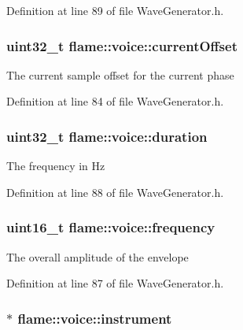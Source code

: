 Definition at line 89 of file Wave\-Generator.\-h.

\hypertarget{structflame_1_1voice_af850619ff5aa4d53276cc3dafd7d4bc8}{
\subsubsection[{current\-Offset}]{\setlength{\rightskip}{0pt plus 5cm}uint32\-\_\-t flame\-::voice\-::current\-Offset}}\label{structflame_1_1voice_af850619ff5aa4d53276cc3dafd7d4bc8}
The current sample offset for the current phase 

Definition at line 84 of file Wave\-Generator.\-h.

\hypertarget{structflame_1_1voice_a7eee8064edb15ee001e43a604d94fb79}{
\subsubsection[{duration}]{\setlength{\rightskip}{0pt plus 5cm}uint32\-\_\-t flame\-::voice\-::duration}}\label{structflame_1_1voice_a7eee8064edb15ee001e43a604d94fb79}
The frequency in Hz 

Definition at line 88 of file Wave\-Generator.\-h.

\hypertarget{structflame_1_1voice_aec3efeb3d7db126697063f95f57d4696}{
\subsubsection[{frequency}]{\setlength{\rightskip}{0pt plus 5cm}uint16\-\_\-t flame\-::voice\-::frequency}}\label{structflame_1_1voice_aec3efeb3d7db126697063f95f57d4696}
The overall amplitude of the envelope 

Definition at line 87 of file Wave\-Generator.\-h.

\hypertarget{structflame_1_1voice_aa2aa1f4b2ce3a2e90a123b2a99d4878b}{
\subsubsection[{instrument}]{$\ast$ flame\-::voice\-::instrument}}\label{structflame_1_1voice_aa2aa1f4b2ce3a2e90a123b2a99d4878b}


